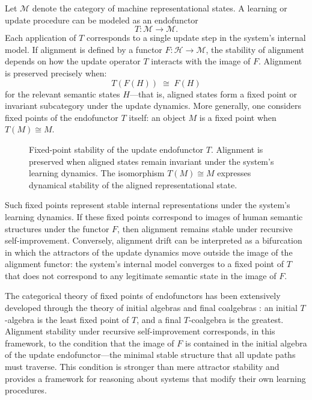 \documentclass[12pt]{article}
\theoremstyle{definition}
\begin{document}
Let $\mathcal{M}$ denote the category of machine representational states. A
learning or update procedure can be modeled as an endofunctor
\begin{equation}
  T : \mathcal{M} \to \mathcal{M}.
\end{equation}
Each application of $T$ corresponds to a single update step in the system's
internal model. If alignment is defined by a functor $F : \mathcal{H} \to
\mathcal{M}$, the stability of alignment depends on how the update operator $T$
interacts with the image of $F$. Alignment is preserved precisely when:
\begin{equation}
  T(F(H)) \;\cong\; F(H)
\end{equation}
for the relevant semantic states $H$---that is, aligned states form a fixed
point or invariant subcategory under the update dynamics. More generally, one
considers fixed points of the endofunctor $T$ itself: an object $M$ is a fixed
point when $T(M) \cong M$.

\begin{figure}[h]
\centering
{}
\caption{Fixed-point stability of the update endofunctor $T$. Alignment is
preserved when aligned states remain invariant under the system's learning
dynamics. The isomorphism $T(M) \cong M$ expresses dynamical stability of the
aligned representational state.}
\end{figure}

Such fixed points represent stable internal representations under the system's
learning dynamics. If these fixed points correspond to images of human semantic
structures under the functor $F$, then alignment remains stable under recursive
self-improvement. Conversely, alignment drift can be interpreted as a bifurcation
in which the attractors of the update dynamics move outside the image of the
alignment functor: the system's internal model converges to a fixed point of $T$
that does not correspond to any legitimate semantic state in the image of $F$.

The categorical theory of fixed points of endofunctors has been extensively
developed through the theory of initial algebras and final coalgebras
\citep{adamek2005}: an initial $T$-algebra is the least fixed point of $T$, and
a final $T$-coalgebra is the greatest. Alignment stability under recursive
self-improvement corresponds, in this framework, to the condition that the image
of $F$ is contained in the initial algebra of the update endofunctor---the
minimal stable structure that all update paths must traverse. This condition is
stronger than mere attractor stability and provides a framework for reasoning
about systems that modify their own learning procedures.
\end{document}

